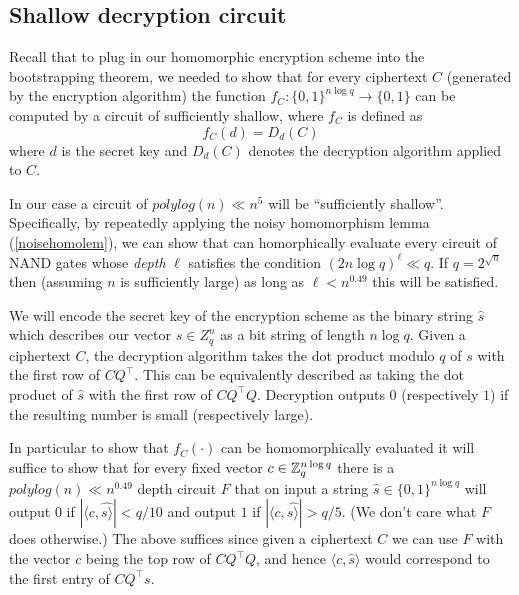 \subsection{Shallow decryption circuit}\label{15-Shallow-decryption-cir}

Recall that to plug in our homomorphic encryption scheme into the
bootstrapping theorem, we needed to show that for every ciphertext \(C\)
(generated by the encryption algorithm) the function
\(f_C:\{0,1\}^{n \log q} \rightarrow \{0,1\}\) can be computed by a
circuit of sufficiently shallow, where \(f_C\) is defined as
\begin{equation*}
f_C(d) = D_d(C)
\end{equation*}
where \(d\) is the secret key and \(D_d(C)\) denotes the decryption
algorithm applied to \(C\).

In our case a circuit of \(polylog(n) \ll n^5\) will be ``sufficiently
shallow''. Specifically, by repeatedly applying the noisy homomorphism
lemma (\cref{noisehomolem}), we can show that can homorphically evaluate
every circuit of NAND gates whose \emph{depth} \(\ell\) satisfies the
condition \((2n\log q)^\ell \ll q\). If \(q = 2^{\sqrt{n}}\) then
(assuming \(n\) is sufficiently large) as long as \(\ell < n^{0.49}\)
this will be satisfied.

We will encode the secret key of the encryption scheme as the binary
string \(\hat{s}\) which describes our vector \(s \in Z_q^n\) as a bit
string of length \(n\log q\). Given a ciphertext \(C\), the decryption
algorithm takes the dot product modulo \(q\) of \(s\) with the first row
of \(\ensuremath{\mathit{CQ}}^\top\). This can be equivalently described
as taking the dot product of \(\hat{s}\) with the first row of
\(\ensuremath{\mathit{CQ}}^\top Q\). Decryption outputs \(0\)
(respectively \(1\)) if the resulting number is small (respectively
large).

In particular to show that \(f_C(\cdot)\) can be homomorphically
evaluated it will suffice to show that for every fixed vector
\(c\in {\mathbb{Z}}_q^{n\log q}\) there is a \(polylog(n) \ll n^{0.49}\) depth
circuit \(F\) that on input a string \(\hat{s}\in\{0,1\}^{n \log q}\)
will output \(0\) if \(|\langle c,\hat{s \rangle}| < q/10\) and output
\(1\) if \(|\langle c,\hat{s \rangle}| > q/5\). (We don't care what
\(F\) does otherwise.) The above suffices since given a ciphertext \(C\)
we can use \(F\) with the vector \(c\) being the top row of
\(\ensuremath{\mathit{CQ}}^\top Q\), and hence
\(\langle c,\hat{s} \rangle\) would correspond to the first entry of
\(\ensuremath{\mathit{CQ}}^\top s\).


